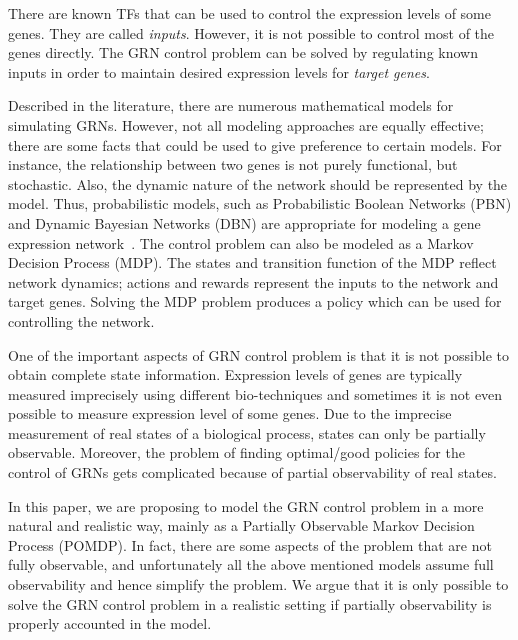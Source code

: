 There are known TFs that can be used to control the expression levels of some genes. They are called
\emph{inputs}. However, it is not possible to control most of the genes directly. The GRN control problem can
be solved by regulating known inputs in order to maintain desired expression levels for \emph{target genes}.

Described in the literature, there are numerous mathematical models for simulating GRNs. However, not all
modeling approaches are equally effective; there are some facts that could be used to give preference to
certain models. For instance, the relationship between two genes is not purely functional, but stochastic.
Also, the dynamic nature of the network should be represented by the model. Thus, probabilistic models, such
as Probabilistic Boolean Networks (PBN) and Dynamic Bayesian Networks (DBN) are appropriate for modeling a
gene expression network~\cite{Kauffman93}. The control problem can also be modeled as a Markov Decision
Process (MDP). The states and transition function of the MDP reflect network dynamics; actions and rewards
represent the inputs to the network and target genes. Solving the MDP problem produces a policy which can be
used for controlling the network.

One of the important aspects of GRN control problem is that it is not possible to obtain complete state information. Expression levels of genes are typically measured imprecisely using different bio-techniques and sometimes it is not even possible to measure expression level of some genes. Due to the imprecise measurement of real states of a biological process, states can only be partially observable. Moreover, the problem of finding optimal/good policies for the control of GRNs gets complicated because of partial observability of real states.

In this paper, we are proposing to model the GRN control problem in a more natural and realistic way, mainly
as a Partially Observable Markov Decision Process (POMDP). In fact, there are some aspects of the problem
that are not fully observable, and unfortunately all the above mentioned models assume full observability and
hence simplify the problem. We argue that it is only possible to solve the GRN control problem in a realistic
setting if partially observability is properly accounted in the model.

